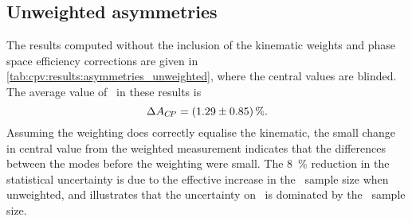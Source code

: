\subsection{Unweighted asymmetries}

The results computed without the inclusion of the kinematic weights and phase 
space efficiency corrections are given in 
\cref{tab:cpv:results:asymmetries_unweighted}, where the central values are 
blinded.
The average value of \dACP\ in these results is
\begin{equation*}
  \dACP = \deltaACPUnweighted.
\end{equation*}
Assuming the weighting does correctly equalise the kinematic, the small change 
in central value from the weighted measurement indicates that the differences 
between the modes before the weighting were small.
The \SI{8}{\percent} reduction in the statistical uncertainty is due to the 
effective increase in the \ppipi\ sample size when unweighted, and illustrates 
that the uncertainty on \dACP\ is dominated by the \pKK\ sample size.

\begin{table}
  \centering
  \caption{%
    Measured asymmetries, in percent, for each data sub-sample and combination 
    of sub-samples.
    The computation of the combinations, ``2011 + 2012'' and ``Average'', is 
    defined in \cref{chap:cpv:results:combination}.
    The central values of all measurements are blinded.
  }
  \label{tab:cpv:results:asymmetries}
  
\end{table}

\begin{table}
  \centering
  \caption{%
    Measured asymmetries, in percent, for each data sub-sample and combination 
    of sub-samples without the inclusion of the kinematic weights and phase 
    space efficiency correction.
    The computation of the combinations, ``2011 + 2012'' and ``Average'', is 
    defined in \cref{chap:cpv:results:combination}.
    The central values of all measurements are blinded.
  }
  \label{tab:cpv:results:asymmetries_unweighted}
  
\end{table}


